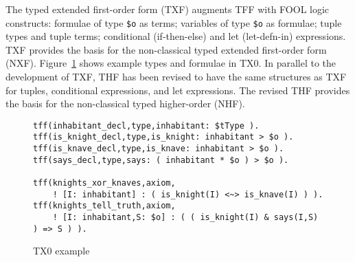 \documentclass[runningheads]{llncs}
\begin{document}
% 
% 
% 
% 

The typed extended first-order form (TXF) \cite{SK18} augments TFF with FOOL logic \cite{KKV15} 
constructs:
formulae of type {\tt \$o} as terms; 
variables of type {\tt \$o} as formulae;
tuple types and tuple terms;
conditional (if-then-else) and let (let-defn-in) expressions.
TXF provides the basis for the non-classical typed extended first-order form (NXF).
Figure~\ref{TX0Example} shows example types and formulae in TX0.
In parallel to the development of TXF, THF has been revised to have the same structures as TXF 
for tuples, conditional expressions, and let expressions. 
The revised THF provides the basis for the non-classical typed higher-order (NHF).

\begin{figure}[htbp]
\small
{}
\begin{verbatim}
tff(inhabitant_decl,type,inhabitant: $tType ).
tff(is_knight_decl,type,is_knight: inhabitant > $o ).
tff(is_knave_decl,type,is_knave: inhabitant > $o ).
tff(says_decl,type,says: ( inhabitant * $o ) > $o ).

tff(knights_xor_knaves,axiom,
    ! [I: inhabitant] : ( is_knight(I) <~> is_knave(I) ) ).
tff(knights_tell_truth,axiom,
    ! [I: inhabitant,S: $o] : ( ( is_knight(I) & says(I,S) ) => S ) ).
\end{verbatim}
\caption{TX0 example}
\label{TX0Example}
\end{figure}
\end{document}
